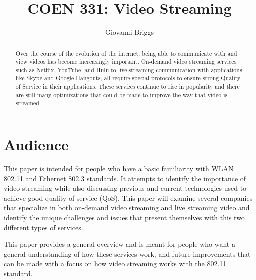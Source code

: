 \documentclass[12pt]{article}
\begin{document}
\title{COEN 331: Video Streaming}
\author{Giovanni Briggs}

\maketitle

\begin{abstract}
Over the course of the evolution of the internet, being able to communicate with and view videos has become increasingly important. On-demand video streaming services such as Netflix, YouTube, and Hulu to live streaming communication with applications like Skype and Google Hangouts, all require special protocols to ensure strong Quality of Service in their applications.  These services continue to rise in popularity and there are still many optimizations that could be made to improve the way that video is streamed.

\end{abstract}
\clearpage

\tableofcontents
\clearpage

\listoffigures
\clearpage

\section{Audience}
This paper is intended for people who have a basic familiarity with WLAN 802.11 and Ethernet 802.3 standards.  It attempts to identify the importance of video streaming while also discussing previous and current technologies used to achieve good quality of service (QoS).  This paper will examine several companies that specialize in both on-demand video streaming and live streaming video and identify the unique challenges and issues that present themselves with this two different types of services.

This paper provides a general overview and is meant for people who want a general understanding of how these services work, and future improvements that can be made with a focus on how video streaming works with the 802.11 standard.
\end{document}
